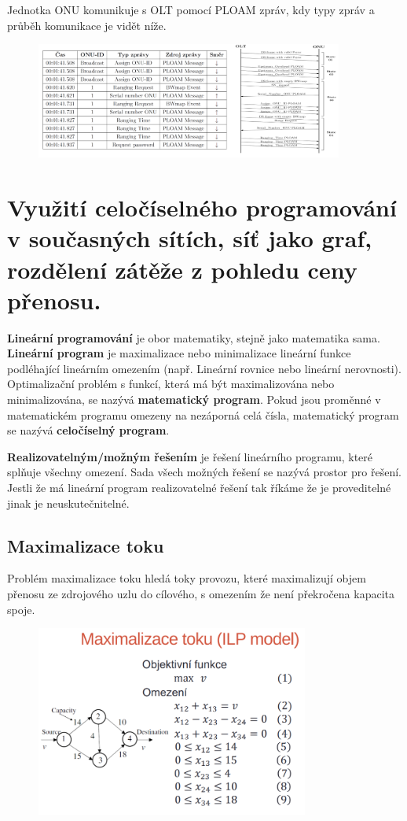 Jednotka ONU komunikuje s OLT pomocí PLOAM zpráv, kdy typy zpráv a průběh komunikace je vidět níže.

\begin{figure} [h]
    \centering
    \includegraphics[width=0.9\textwidth]{snimky/aktivaceONU.png}
\end{figure}


\clearpage
\section{Využití celočíselného programování v současných sítích, síť jako graf, rozdělení zátěže z pohledu ceny přenosu.}
\textbf{Lineární programování} je obor matematiky, stejně jako matematika sama. \textbf{Lineární program} je maximalizace nebo minimalizace lineární funkce podléhající lineárním omezením (např. Lineární rovnice nebo lineární nerovnosti). Optimalizační problém s funkcí, která má být maximalizována nebo minimalizována, se nazývá \textbf{matematický program}. Pokud jsou proměnné v matematickém programu omezeny na nezáporná celá čísla, matematický program se nazývá \textbf{celočíselný program}.

\textbf{Realizovatelným/možným řešením} je řešení lineárního programu, které splňuje všechny omezení. Sada všech možných řešení se nazývá prostor pro řešení. Jestli že má lineární program realizovatelné řešení tak říkáme že je proveditelné jinak je neuskutečnitelné.

\subsection{Maximalizace toku}
Problém maximalizace toku hledá toky provozu, které maximalizují objem přenosu ze zdrojového uzlu do cílového, s omezením že není překročena kapacita spoje.

\begin{figure} [h]
    \centering
    \includegraphics[width=0.8\textwidth]{snimky/ilpModel.png}
\end{figure}

